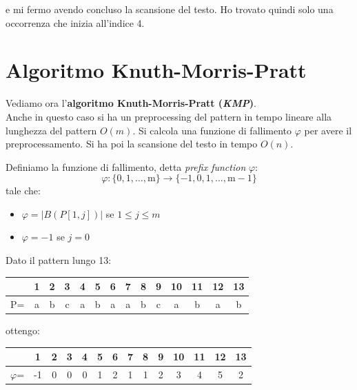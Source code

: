\documentclass[a4paper,12pt, oneside]{book}
\begin{document}
\begin{esempio}
\begin{center}
  \end{center}
  e mi fermo avendo concluso la scansione del testo. Ho trovato quindi solo una
  occorrenza che inizia all'indice 4.
\end{esempio}
\section{Algoritmo Knuth-Morris-Pratt}
Vediamo ora l'\textbf{algoritmo Knuth-Morris-Pratt (\textit{KMP})}.\\
Anche in questo caso si ha un preprocessing del pattern in tempo lineare alla
lunghezza del pattern $O(m)$. Si calcola una funzione di fallimento $\varphi$
per avere il preprocessamento. Si ha poi la scansione del testo in tempo $O(n)$.
\begin{definizione}
  Definiamo la funzione di fallimento, detta \textit{prefix function}
  $\varphi$: 
  \[\varphi:\{0,1, \ldots, \mathrm{m}\} \rightarrow\{-1,0,1, \ldots,
    \mathrm{m}-1\}\]
  tale che:
  \begin{itemize}
    \item $\varphi=|B(P[1,j])|$ se $1\leq j\leq m$
    \item $\varphi=-1$ se $j=0$
  \end{itemize}
\end{definizione}
\begin{esempio}
  Dato il pattern lungo 13:
  \begin{table}[H]
    \centering
    \begin{tabular}{c||c|c|c|c|c|c|c|c|c|c|c|c|c}
      \hline
      & 1 & 2 & 3 & 4 & 5 & 6 & 7 & 8 & 9 & 10 & 11 & 12 & 13 \\
      \hline
      P=&a& b & c& a& b& a &a &b &c &a&b&a&b\\
      \hline
    \end{tabular}
  \end{table}
  ottengo:
   \begin{table}[H]
    \centering
    \begin{tabular}{c||c|c|c|c|c|c|c|c|c|c|c|c|c}
      \hline
      & 1 & 2 & 3 & 4 & 5 & 6 & 7 & 8 & 9 & 10 & 11 & 12 & 13 \\
      \hline
      $\varphi$=&-1& 0 & 0& 0& 1 &2 &1 &1 &2&3&4&5&2\\
      \hline
    \end{tabular}
  \end{table}
\end{esempio}
\end{document}
